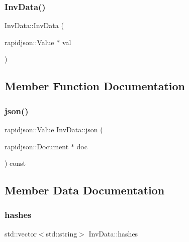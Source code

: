 \mbox{\label{structInvData_af6b3a71e6b4e0487f33ccf0b22a38813}} 
\subsubsection{\texorpdfstring{Inv\+Data()}{InvData()}\hspace{0.1cm}{\footnotesize\ttfamily [2/2]}}
{\footnotesize\ttfamily Inv\+Data\+::\+Inv\+Data (\begin{DoxyParamCaption}\item[{rapidjson\+::\+Value $\ast$}]{val }\end{DoxyParamCaption})\hspace{0.3cm}{\ttfamily [explicit]}}



\subsection{Member Function Documentation}
\mbox{\label{structInvData_a660c6492448faa3a19ac27c62047152d}} 
\subsubsection{\texorpdfstring{json()}{json()}}
{\footnotesize\ttfamily rapidjson\+::\+Value Inv\+Data\+::json (\begin{DoxyParamCaption}\item[{rapidjson\+::\+Document $\ast$}]{doc }\end{DoxyParamCaption}) const}



\subsection{Member Data Documentation}
\mbox{\label{structInvData_ac7cd0400472c8a41a86960bc37ad7a3d}} 
\subsubsection{\texorpdfstring{hashes}{hashes}}
{\footnotesize\ttfamily std\+::vector$<$std\+::string$>$ Inv\+Data\+::hashes}

